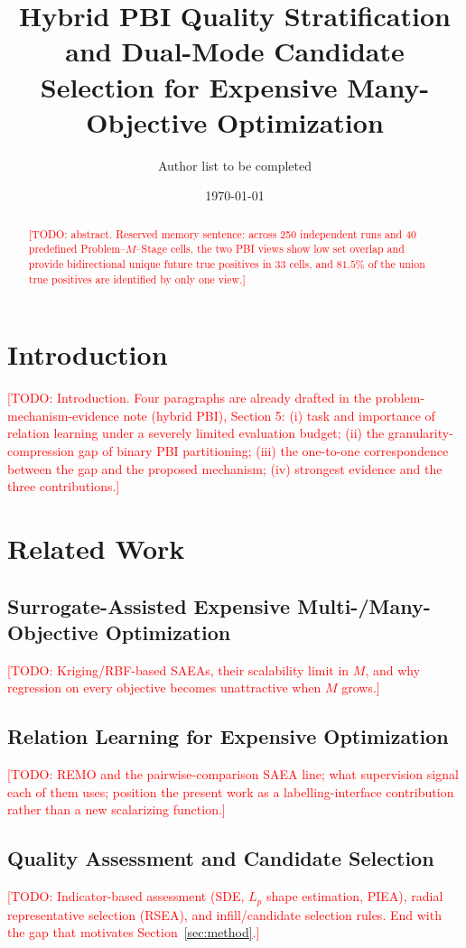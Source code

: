\documentclass[11pt,a4paper]{article}
\title{Hybrid PBI Quality Stratification and Dual-Mode Candidate Selection
for Expensive Many-Objective Optimization}
\author{Author list to be completed}
\date{\today}
\newcommand{\TODO}[1]{\textcolor{red}{[TODO: #1]}}
\begin{document}
\maketitle

\begin{abstract}
\TODO{abstract. Reserved memory sentence: across 250 independent runs and 40
predefined Problem--$M$--Stage cells, the two PBI views show low set overlap and
provide bidirectional unique future true positives in 33 cells, and $81.5\%$ of
the union true positives are identified by only one view.}
\end{abstract}

\section{Introduction}
\label{sec:intro}

\TODO{Introduction. Four paragraphs are already drafted in the
problem-mechanism-evidence note (hybrid PBI), Section 5: (i) task and
importance of relation learning under a severely limited evaluation budget;
(ii) the granularity-compression gap of binary PBI partitioning; (iii) the
one-to-one correspondence between the gap and the proposed mechanism;
(iv) strongest evidence and the three contributions.}

\section{Related Work}
\label{sec:related}

\subsection{Surrogate-Assisted Expensive Multi-/Many-Objective Optimization}
\label{sec:related:saea}
\TODO{Kriging/RBF-based SAEAs, their scalability limit in $M$, and why
regression on every objective becomes unattractive when $M$ grows.}

\subsection{Relation Learning for Expensive Optimization}
\label{sec:related:relation}
\TODO{REMO and the pairwise-comparison SAEA line; what supervision signal each
of them uses; position the present work as a labelling-interface contribution
rather than a new scalarizing function.}

\subsection{Quality Assessment and Candidate Selection}
\label{sec:related:selection}
\TODO{Indicator-based assessment (SDE, $L_p$ shape estimation, PIEA), radial
representative selection (RSEA), and infill/candidate selection rules. End with
the gap that motivates Section~\ref{sec:method}.}
\end{document}
